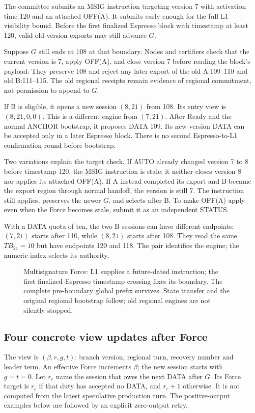 \documentclass[11pt,a4paper]{article}
\newcommand{\TB}{\mathit{TB}}
\begin{document}
The committee submits an MSIG instruction targeting version 7 with
activation time 120 and an attached OFF(A). It submits early enough
for the full L1 visibility bound. Before the first finalized Espresso
block with timestamp at least 120, valid old-version exports may still
advance $G$.

Suppose $G$ still ends at 108 at that boundary. Nodes and certifiers
check that the current version is 7, apply OFF(A), and close version 7
before reading the block's payload. They preserve 108 and reject any
later export of the old A:109--110 and old B:111--115. The old regional
receipts remain evidence of regional commitment, not permission to
append to $G$.

If B is eligible, it opens a new session $(8,21)$ from 108. Its entry
view is $(8,21,0,0)$. This is a different engine from $(7,21)$.
After Ready and the normal ANCHOR bootstrap, it proposes DATA 109.
Its new-version DATA can be accepted only in a later Espresso block.
There is no second Espresso-to-L1 confirmation round before bootstrap.

Two variations explain the target check. If AUTO already changed
version 7 to 8 before timestamp 120, the MSIG instruction is stale:
it neither closes version 8 nor applies its attached OFF(A). If A
instead completed its export and B became the export region through
normal handoff, the version is still 7. The instruction still applies,
preserves the newer $G$, and selects after B. To make OFF(A) apply even
when the Force becomes stale, submit it as an independent STATUS.

With a DATA quota of ten, the two B sessions can have different
endpoints: $(7,21)$ starts after 110, while $(8,21)$ starts after 108.
They read the same $\TB_{21}=10$ but have endpoints 120 and 118.
The pair identifies the engine; the numeric index selects its authority.

\begin{figure}[htbp]\centering

\caption{Multisignature Force: L1 supplies a future-dated instruction;
the first finalized Espresso timestamp crossing fixes its boundary.
The complete pre-boundary global prefix survives. State transfer and
the original regional bootstrap follow; old regional engines are not
silently stopped.}
\label{fig:forced-cross-region}
\end{figure}

\FloatBarrier
\subsection{Four concrete view updates after Force}
\label{sec:force-view-examples}
The view is $(\beta,r,g,t)$: branch version, regional turn,
recovery number and leader term. An effective Force increments $\beta$;
the new session starts with $g=t=0$. Let $r_c$ name the session that
owes the next DATA after $G$. Its Force target is $r_c$ if that duty
has accepted no DATA, and $r_c+1$ otherwise. It is not computed from
the latest speculative production turn. The positive-output examples
below are followed by an explicit zero-output retry.
\end{document}
